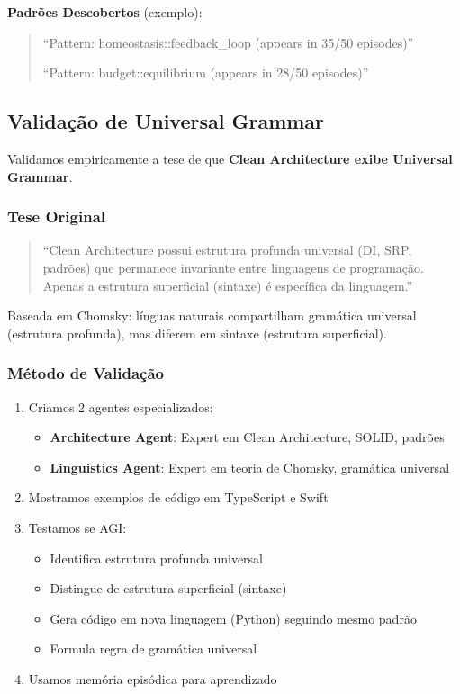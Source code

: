 \documentclass[11pt]{article}
\begin{document}
\textbf{Padrões Descobertos} (exemplo):
\begin{quote}
``Pattern: homeostasis::feedback\_loop (appears in 35/50 episodes)''

``Pattern: budget::equilibrium (appears in 28/50 episodes)''
\end{quote}

\subsection{Validação de Universal Grammar}

Validamos empiricamente a tese de que \textbf{Clean Architecture exibe Universal Grammar}.

\subsubsection{Tese Original}

\begin{quote}
``Clean Architecture possui estrutura profunda universal (DI, SRP, padrões) que permanece invariante entre linguagens de programação. Apenas a estrutura superficial (sintaxe) é específica da linguagem.''
\end{quote}

Baseada em Chomsky: línguas naturais compartilham gramática universal (estrutura profunda), mas diferem em sintaxe (estrutura superficial).

\subsubsection{Método de Validação}

\begin{enumerate}
    \item Criamos 2 agentes especializados:
    \begin{itemize}
        \item \textbf{Architecture Agent}: Expert em Clean Architecture, SOLID, padrões
        \item \textbf{Linguistics Agent}: Expert em teoria de Chomsky, gramática universal
    \end{itemize}

    \item Mostramos exemplos de código em TypeScript e Swift

    \item Testamos se AGI:
    \begin{itemize}
        \item Identifica estrutura profunda universal
        \item Distingue de estrutura superficial (sintaxe)
        \item Gera código em nova linguagem (Python) seguindo mesmo padrão
        \item Formula regra de gramática universal
    \end{itemize}

    \item Usamos memória episódica para aprendizado
\end{enumerate}
\end{document}
